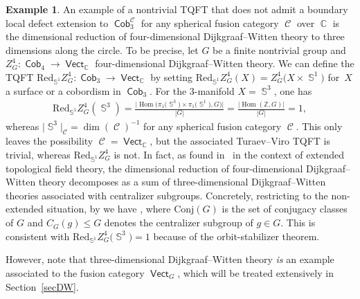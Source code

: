 \documentclass[10pt,a4paper]{amsart}
\DeclareMathOperator{\Hom}{Hom}
\DeclareMathOperator{\vect}{\mathsf{Vect}}
\DeclareMathOperator{\C}{\mathbb{C}}
\DeclareMathOperator{\Sp}{\mathbb{S}}
\DeclareMathOperator{\Cob}{\mathsf{Cob}}
\DeclareMathOperator{\calc}{\mathcal{C}}
\numberwithin{equation}{section}
\theoremstyle{definition}
\newtheorem{Example}[Example]{Example}
\begin{document}
\begin{Example}An example of a nontrivial TQFT that does not admit a boundary local defect extension to $\Cob_3^{\calc}$ for any spherical fusion category $\calc$ over $\C$ is the dimensional reduction of four-dimensional Dijkgraaf--Witten theory to three dimensions along the circle. To be precise, let $G$ be a finite nontrivial group and $Z_G^4\colon \Cob_4 \rightarrow \vect_{\C}$ four-dimensional Dijkgraaf--Witten theory. We can define the TQFT $\mathrm{Red}_{\Sp^1}Z_G^4\colon \Cob_3 \rightarrow \vect_{\C}$ by setting $\mathrm{Red}_{\Sp^1}Z_G^4(X) = Z_G^4\bigl(X \times \Sp^1\bigr)$ for~$X$ a surface or a cobordism in $\Cob_3$. For the 3-manifold $X = \Sp^3$, one has
 \begin{align*}
 \mathrm{Red}_{\Sp^1}Z_G^4(\Sp^3) = \frac{\bigl|{\Hom\bigl(\pi_1\bigl(\Sp^3\bigr) \times \pi_1\bigl(\Sp^1\bigr), G\bigr)}\bigr|}{|G|} = \frac{|{\Hom(\mathbb{Z}, G)}|}{|G|} = 1,
 \end{align*}
 whereas $\bigl| {\Sp^3}\bigr|_{\calc} = \dim(\calc)^{-1}$ for any spherical fusion category $\calc$. This only leaves the possibility $\calc = \vect_{\C}$, but the associated Turaev--Viro TQFT is trivial, whereas $\mathrm{Red}_{\Sp^1}Z_G^4$ is not. In fact, as found in~\cite{MW} in the context of extended topological field theory, the dimensional reduction of four-dimensional Dijkgraaf--Witten theory decomposes as a sum of three-dimensional Dijkgraaf--Witten theories associated with centralizer subgroups. Concretely, restricting to the non-extended situation, by \cite[Corollary~4.3]{MW} we have
 \smash{$ \mathrm{Red}_{\Sp^1}Z_G^4 \cong \bigoplus_{[g] \in \mathrm{Conj}(G)} Z_{C_G(g)}^3$},
 where $\mathrm{Conj}(G)$ is the set of conjugacy classes of $G$ and $C_G(g) \leq G$ denotes the centralizer subgroup of $g \in G$. This is consistent with $\mathrm{Red}_{\Sp^1}Z_G^4\bigl(\Sp^3\bigr) = 1$ because of the orbit-stabilizer theorem.

 However, note that three-dimensional Dijkgraaf--Witten theory \textit{is} an example associated to the fusion category $\vect_G$, which will be treated extensively in Section~\ref{secDW}.
\end{Example}
\end{document}

